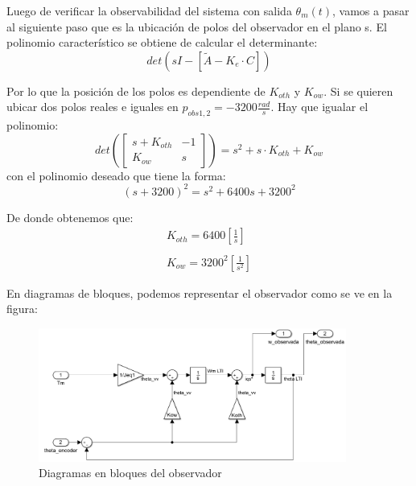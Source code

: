 \documentclass[10pt]{article}
\begin{document}
Luego de verificar la observabilidad del sistema con salida $\theta_m(t)$, vamos a pasar al siguiente paso que es la ubicación de polos del observador en el plano s.
El polinomio característico se obtiene de calcular el determinante:
\begin{equation}
	det(sI-[\tilde{A}-K_e\cdot C])
\end{equation}

Por lo que la posición de los polos es dependiente de $K_{oth}$ y $K_{ow}$.
Si se quieren ubicar dos polos reales e iguales en $p_{obs1,2}=-3200\frac{rad}{s}$.
Hay que igualar el polinomio:
\begin{equation}
	det\left( 
		\begin{bmatrix}
			s+K_{oth} & -1 \\
			K_{ow} & s
		\end{bmatrix}
	 \right)=s^2+s\cdot K_{oth}+K_{ow}
\end{equation}
con el polinomio deseado que tiene la forma:
\begin{equation}
	(s+3200)^2=s^2+6400s+3200^2
\end{equation}

De donde obtenemos que:
\begin{equation}
	\begin{matrix}
		K_{oth}=6400 \left[\frac{1}{s}\right]\\
		\\
		K_{ow} =3200^2 \left[\frac{1}{s^2}\right]
	\end{matrix}
\end{equation}

En diagramas de bloques, podemos representar el observador como se ve en la figura:
\begin{figure}[h!]
	\centering
	\includegraphics[width=0.9\textwidth]{diagramaObservador.png}
	\caption{\label{fig:consigna2}Diagramas en bloques del observador}
\end{figure}
\end{document}
